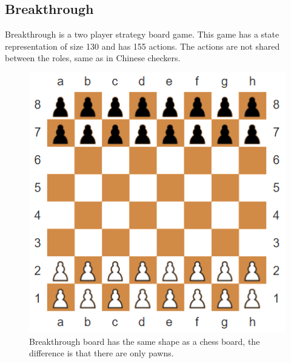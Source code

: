 \documentclass[twocolumn, letterpaper, 10 pt, conference]{ieeeconf}  %
\begin{document}
    \subsection{Breakthrough}
    Breakthrough is a two player strategy board game. This game has a state representation of size 130 and has 155 actions. The actions are not shared between the roles, same as in Chinese checkers. 

    \begin{figure}[H]
        \centering
        \includegraphics[scale=0.8]{Images/breakthrough.png}
        \caption{Breakthrough board has the same shape as a chess board, the difference is that there are only pawns.}
        \label{fig:single_role_model}
    \end{figure}


\end{document}
